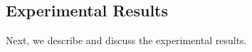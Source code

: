 







\subsection{Experimental Results}
\label{sec:expres-results}
\noindent
Next, we describe and discuss the experimental results.

